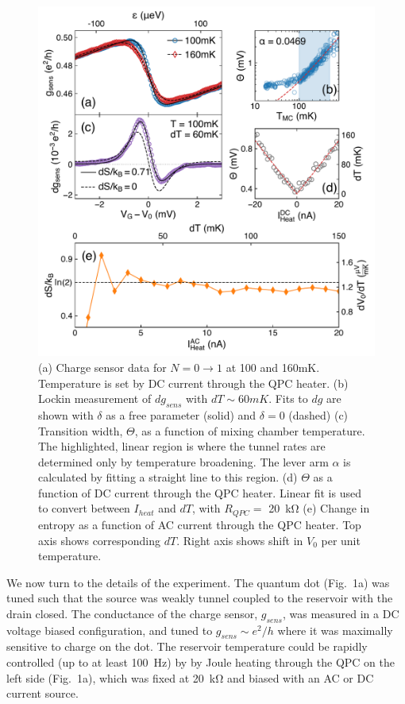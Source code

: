 \documentclass[twocolumn,showpacs,preprintnumbers,amsmath,amssymb,pra,aps,superscriptaddress]{revtex4-1}
\begin{document}


\begin{figure}[!]
        \includegraphics[width=1.0\columnwidth]{../figures/figure_2.pdf}
        \caption{\label{fig:fig2}(a) Charge sensor data for $N=0 \rightarrow 1$ at 100 and 160mK. Temperature is set by DC current through the QPC heater. (b) Lockin measurement of $dg_{sens}$ with $dT \sim 60mK$. Fits to $dg$ are shown with $\delta$ as a free parameter (solid) and $\delta=0$ (dashed) (c) Transition width, $\Theta$, as a function of mixing chamber temperature. The highlighted, linear region is where the tunnel rates are determined only by temperature broadening. The lever arm $\alpha$ is calculated by fitting a straight line to this region. (d) $\Theta$ as a function of DC current through the QPC heater. Linear fit is used to convert between $I_{heat}$ and $dT$, with $R_{QPC} = $ \SI{20}{\kilo\ohm} (e) Change in entropy as a function of AC current through the QPC heater. Top axis shows corresponding $dT$. Right axis shows shift in $V_0$ per unit temperature.}
\end{figure}

We now turn to the details of the experiment.  The quantum dot (Fig.~1a) was tuned such that the source was weakly tunnel coupled to the reservoir with the drain closed. The conductance of the charge sensor,  $g_{sens}$, was measured in a DC voltage biased configuration, and tuned to $g_{sens}{\sim}e^2/h$ where it was maximally sensitive to charge on the dot.  The reservoir temperature could be rapidly controlled (up to at least  \SI{100}{\hertz}) by by Joule heating through the QPC on the left side (Fig.~1a), which was fixed at \SI{20}{\kilo\ohm} and biased with an AC or DC current source.
\end{document}
